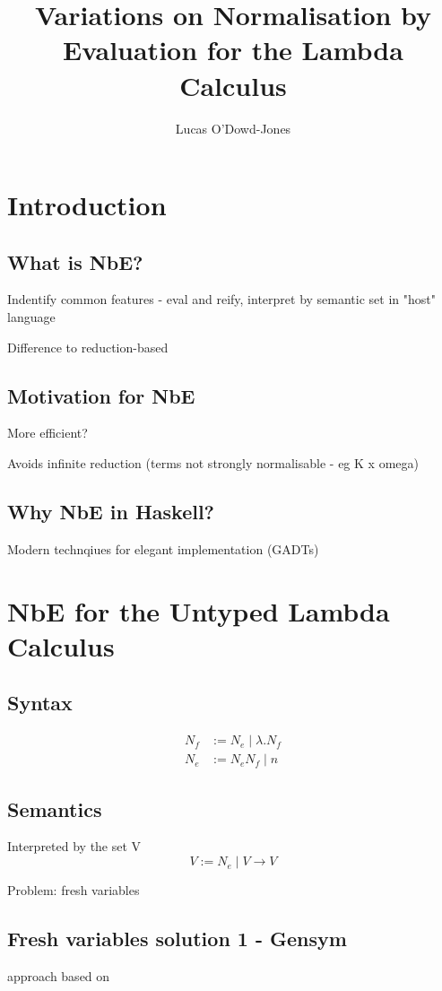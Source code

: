 \documentclass{article}
\title{Variations on Normalisation by Evaluation for the Lambda Calculus }
\author{Lucas O'Dowd-Jones}
\date{}
\begin{document}
\maketitle

\section{Introduction}
\subsection{What is NbE?}
Indentify common features - eval and reify, interpret by semantic set in "host" language

Difference to reduction-based

\subsection{Motivation for NbE}

More efficient?

Avoids infinite reduction (terms not strongly normalisable - eg K x omega)

\subsection{Why NbE in Haskell?}

Modern technqiues for elegant implementation (GADTs)

\section{NbE for the Untyped Lambda Calculus}
\subsection{Syntax}
\begin{align}
    N_f &:= N_e \mid \lambda.N_f  \\
    N_e &:= N_e N_f \mid n
\end{align}
\cite{slides}

\subsection{Semantics}
Interpreted by the set V \cite{slides}
$$
    V := N_e \mid V \rightarrow V
$$

Problem: fresh variables

\subsection{Fresh variables solution 1 - Gensym}
approach based on \cite{slides}
\end{document}
